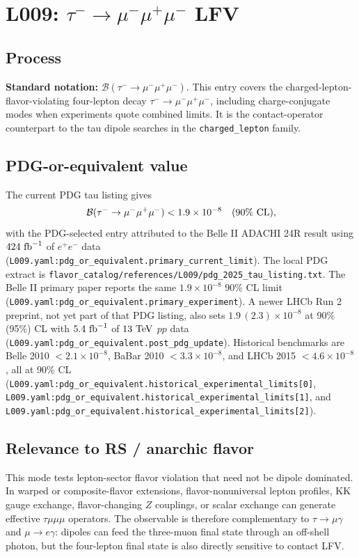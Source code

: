 
\section{L009: \texorpdfstring{\(\tau^- \to \mu^-\mu^+\mu^-\)}{tau -> 3 mu} LFV}

\subsection*{Process}
\textbf{Standard notation:}
\(\mathcal{B}(\tau^- \to \mu^-\mu^+\mu^-)\).
This entry covers the charged-lepton-flavor-violating four-lepton decay
\(\tau^- \to \mu^-\mu^+\mu^-\), including charge-conjugate modes when
experiments quote combined limits.  It is the contact-operator counterpart to
the tau dipole searches in the \texttt{charged\_lepton} family.

\subsection*{PDG-or-equivalent value}
The current PDG tau listing gives
\[
  \mathcal{B}(\tau^- \to \mu^-\mu^+\mu^-) < 1.9\times 10^{-8}
  \quad (90\%~{\rm CL}),
\]
with the PDG-selected entry attributed to the Belle II ADACHI 24R result
using \(424~{\rm fb}^{-1}\) of \(e^+e^-\) data
(\texttt{L009.yaml:pdg\_or\_equivalent.primary\_current\_limit}).  The local
PDG extract is
\texttt{flavor\_catalog/references/L009/pdg\_2025\_tau\_listing.txt}.
The Belle II primary paper reports the same \(1.9\times 10^{-8}\) 90\% CL
limit (\texttt{L009.yaml:pdg\_or\_equivalent.primary\_experiment}).  A newer
LHCb Run 2 preprint, not yet part of that PDG listing, also sets
\(1.9\,(2.3)\times 10^{-8}\) at 90\% (95\%) CL with \(5.4~{\rm fb}^{-1}\) of
\(13~{\rm TeV}\) \(pp\) data
(\texttt{L009.yaml:pdg\_or\_equivalent.post\_pdg\_update}).  Historical
benchmarks are Belle 2010 \(<2.1\times 10^{-8}\), BaBar 2010
\(<3.3\times 10^{-8}\), and LHCb 2015 \(<4.6\times 10^{-8}\), all at 90\% CL
(\texttt{L009.yaml:pdg\_or\_equivalent.historical\_experimental\_limits[0]},
\texttt{L009.yaml:pdg\_or\_equivalent.historical\_experimental\_limits[1]},
and \texttt{L009.yaml:pdg\_or\_equivalent.historical\_experimental\_limits[2]}).

\subsection*{Relevance to RS / anarchic flavor}
This mode tests lepton-sector flavor violation that need not be dipole
dominated.  In warped or composite-flavor extensions, flavor-nonuniversal
lepton profiles, KK gauge exchange, flavor-changing \(Z\) couplings, or
scalar exchange can generate effective \(\tau\mu\mu\mu\) operators.  The
observable is therefore complementary to \(\tau\to\mu\gamma\) and
\(\mu\to e\gamma\): dipoles can feed the three-muon final state through an
off-shell photon, but the four-lepton final state is also directly sensitive
to contact LFV.

